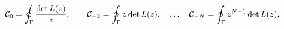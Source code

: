 \begin{equation}
{\cal C}_0=\oint_{\Gamma} \frac{\det L(z)}{z}, \qquad
{\cal C}_{-2}=\oint_{\Gamma} z\det L(z),
\quad\ldots\quad
{\cal C}_{-N}=\oint_{\Gamma} z^{N-1}\det L(z),
\label{Casimiry}
\end{equation}

